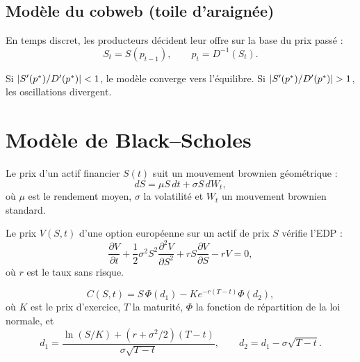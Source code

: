 \subsection{Mod\`ele du cobweb (toile d'araign\'ee)}

\begin{definition}
En temps discret, les producteurs d\'ecident leur offre sur la base
du prix pass\'e :
\[
  S_t = S(p_{t-1}), \qquad p_t = D^{-1}(S_t).
\]
\end{definition}

\begin{proposition}
Si $\left| S'(p^*)/D'(p^*) \right| < 1$, le mod\`ele converge vers l'\'equilibre.
Si $\left| S'(p^*)/D'(p^*) \right| > 1$, les oscillations divergent.
\end{proposition}

\section{Mod\`ele de Black--Scholes}
\label{sec:black_scholes}

\begin{definition}
Le prix d'un actif financier $S(t)$ suit un mouvement brownien
g\'eom\'etrique :
\[
  dS = \mu S\,dt + \sigma S\,dW_t,
\]
o\`u $\mu$ est le rendement moyen, $\sigma$ la volatilit\'e et $W_t$
un mouvement brownien standard.
\end{definition}

\begin{theoreme}
Le prix $V(S,t)$ d'une option europ\'eenne sur un actif de prix $S$
v\'erifie l'EDP :
\[
  \frac{\partial V}{\partial t}
  + \frac{1}{2}\sigma^2 S^2\frac{\partial^2 V}{\partial S^2}
  + rS\frac{\partial V}{\partial S} - rV = 0,
\]
o\`u $r$ est le taux sans risque.
\end{theoreme}

\begin{formules}[title=\textbf{Formule de Black--Scholes pour un call europ\'een}]
\[
  C(S,t) = S\,\Phi(d_1) - Ke^{-r(T-t)}\Phi(d_2),
\]
o\`u $K$ est le prix d'exercice, $T$ la maturit\'e, $\Phi$ la
fonction de r\'epartition de la loi normale, et
\[
  d_1 = \frac{\ln(S/K)+(r+\sigma^2/2)(T-t)}{\sigma\sqrt{T-t}},
  \qquad d_2 = d_1 - \sigma\sqrt{T-t}.
\]
\end{formules}

